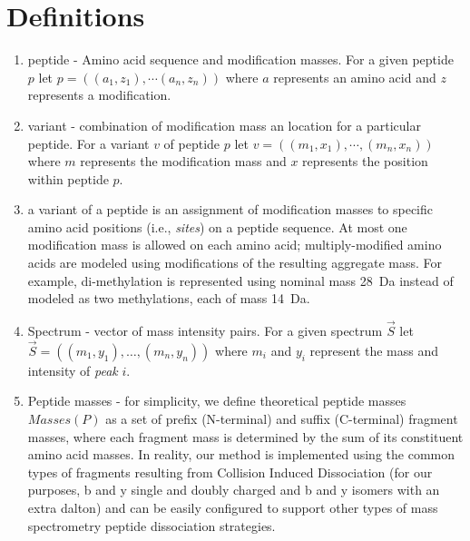 \documentclass[11pt]{article}
\begin{document}
\section{Definitions}
\begin{enumerate}
\item peptide - Amino acid sequence and modification masses. For a given peptide $p$ let $p = ((a_{1},z_{1}), \cdots (a_{n},z_{n}))$ where $a$ represents an amino acid and $z$ represents a modification.
\item variant - combination of modification mass an location for a particular peptide. For a variant $v$ of peptide $p$ let $v = ((m_{1},x_{1}), \cdots, (m_{n},x_{n}))$ where $m$ represents the modification mass and $x$ represents the position within peptide $p$.
\item a variant of a peptide is an assignment of modification masses to specific amino acid positions (i.e., {\em sites}) on a peptide sequence. At most one modification mass is allowed on each amino acid; multiply-modified amino acids are modeled using modifications of the resulting aggregate mass. For example, di-methylation is represented using nominal mass 28~Da instead of modeled as two methylations, each of mass 14~Da.

\item Spectrum - vector of mass intensity pairs. For a given spectrum $\vec{S}$ let $\vec{S} = ((m_{1},y_{1}), \dots, (m_{n},y_{n}))$ where $m_{i}$ and $y_{i}$ represent the mass and intensity of \emph{peak} $i$.
    
\item Peptide masses - for simplicity, we define theoretical peptide masses $Masses(P)$ as a set of prefix (N-terminal) and suffix (C-terminal) fragment masses, where each fragment mass is determined by the sum of its constituent amino acid masses. In reality, our method is implemented using the common types of fragments resulting from Collision Induced Dissociation (for our purposes, b and y single and doubly charged and b and y isomers with an extra dalton) and can be easily configured to support other types of mass spectrometry peptide dissociation strategies.

%
\end{enumerate}
\end{document}
